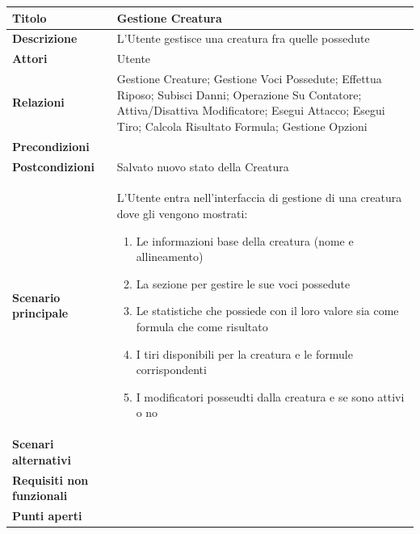 \documentclass[a4paper, 11pt]{article}
\begin{document}
\begin{center}
\begin{tabular}{ |p{5cm}|p{9.5cm}|  }
\hline
\textbf{Titolo} & Gestione Creatura \\
\hline
\textbf{Descrizione} & L'Utente gestisce una creatura fra quelle possedute \\
\hline
\textbf{Attori} & Utente \\
\hline
\textbf{Relazioni} & Gestione Creature; Gestione Voci Possedute; Effettua Riposo; Subisci Danni; Operazione Su Contatore; Attiva/Disattiva Modificatore; Esegui Attacco; Esegui Tiro; Calcola Risultato Formula; Gestione Opzioni \\
\hline
\textbf{Precondizioni} & \\
\hline
\textbf{Postcondizioni} & Salvato nuovo stato della Creatura\\
\hline
\textbf{Scenario principale} & L'Utente entra nell'interfaccia di gestione di una creatura dove gli vengono mostrati:
\begin{enumerate}
    \item Le informazioni base della creatura (nome e allineamento)
    \item La sezione per gestire le sue voci possedute
    \item Le statistiche che possiede con il loro valore sia come formula che come risultato
    \item I tiri disponibili per la creatura e le formule corrispondenti
    \item I modificatori posseudti dalla creatura e se sono attivi o no
\end{enumerate} \\
\hline
\textbf{Scenari alternativi} & \\
\hline
\textbf{Requisiti non funzionali} & \\
\hline
\textbf{Punti aperti} &  \\
\hline
\end{tabular}

\vspace{3em}


\end{center}
\end{document}
